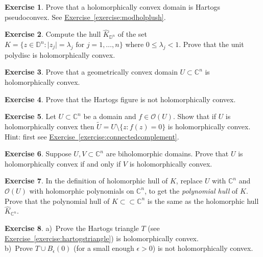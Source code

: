 \documentclass[12pt,openany]{book}
\newcommand{\sabs}[1]{\lvert {#1} \rvert}
\newcommand{\C}{{\mathbb{C}}}
\newcommand{\D}{{\mathbb{D}}}
\newcommand{\sO}{{\mathcal{O}}}
\newcommand{\myindex}[1]{#1\index{#1}}
\theoremstyle{plain}
\theoremstyle{remark}
\theoremstyle{definition}
\newenvironment{exbox}{%
    \def\FrameCommand{\vrule width 1pt \relax\hspace {10pt}}%
    \MakeFramed {\advance \hsize -\width \FrameRestore }%
}{%
    \endMakeFramed
}
\theoremstyle{exercise}
\newtheorem{exercise}{Exercise}[section]
\theoremstyle{example}
\newcommand{\exerciseref}[1]{\hyperref[#1]{Exercise~\ref*{#1}}}
\begin{document}
\begin{exbox}
\begin{exercise}
Prove that a holomorphically convex domain is Hartogs pseudoconvex.
See \exerciseref{exercise:modholplush}.
\end{exercise}

\begin{exercise}
Compute the hull
$\widehat{K}_{\D^n}$ of the set $K = \{ z \in \D^n : \sabs{z_j} =
\lambda_j \text{ for } j=1,\ldots,n \}$ where $0 \leq \lambda_j < 1$.
Prove that the unit polydisc is holomorphically convex.
\end{exercise}

\begin{exercise}
Prove that a geometrically convex domain $U \subset \C^n$
is holomorphically convex.
\end{exercise}

\begin{exercise}
Prove that the Hartogs figure is not holomorphically convex.
\end{exercise}

\begin{exercise}
Let $U \subset \C^n$ be a domain and $f \in \sO(U)$.  Show that if
$U$ is holomorphically convex then $\widetilde{U} = U \setminus \{ z : f(z) = 0 \}$
is holomorphically convex.  
Hint: first see \exerciseref{exercise:connectedcomplement}.
\end{exercise}

\begin{exercise} \label{exercise:biholholconvex}
Suppose $U,V \subset \C^n$ are biholomorphic domains.
Prove that $U$ is holomorphically convex if and only if $V$ is
holomorphically convex.
\end{exercise}

\begin{exercise}
In the definition of holomorphic hull of $K$, replace $U$ with $\C^n$
and $\sO(U)$ with holomorphic polynomials on $\C^n$, to get the
\emph{\myindex{polynomial hull}} of $K$.  Prove that the polynomial hull of
$K \subset \subset \C^n$ is the same as the holomorphic hull $\widehat{K}_{\C^n}$.
\end{exercise}

\begin{exercise}
a)~Prove the Hartogs triangle $T$ (see \exerciseref{exercise:hartogstriangle})
is holomorphically convex.\\
b)~Prove $T \cup B_{\epsilon}(0)$ (for a small enough $\epsilon > 0$) is
not holomorphically convex.
\end{exercise}


\end{exbox}
\end{document}
